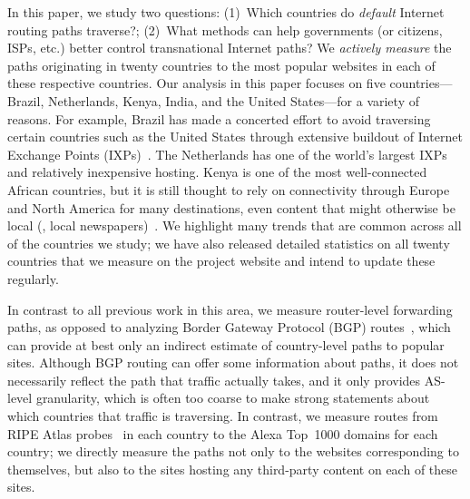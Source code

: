 In this paper, we study two questions: (1)~Which countries do {\em   default}
Internet routing paths traverse?; (2)~What methods can  help governments (or citizens, 
ISPs, etc.) better control transnational Internet paths?  We {\em actively
measure} the paths originating in twenty countries to the most popular
websites in each of these respective countries.
Our analysis in this paper focuses on five countries---Brazil, Netherlands,
Kenya, India, and the United States---for a variety of reasons.  For example,
Brazil has made a concerted effort to avoid traversing certain countries such
as the United States through extensive buildout of Internet Exchange Points
(IXPs)~\cite{brito2016dissecting}. The Netherlands has one of the world's largest IXPs and relatively
inexpensive hosting. Kenya is one of the most well-connected African
countries, but it is still thought to rely on connectivity through Europe and
North America for many destinations, even content that might otherwise be
local (\eg, local newspapers)~\cite{gupta2014peering,fanou2015diversity,chavula2014quantifying,fanou2016pushing}. We highlight many trends that are common across all
of the countries we study; we have also released detailed statistics on all twenty
countries that we measure on the project website and intend to update these regularly.

In contrast to all previous work in this area, we measure router-level
forwarding paths, as opposed to analyzing Border Gateway Protocol (BGP)
routes~\cite{karlin2009nation,shah2015characterizing}, which can provide at
best only an indirect estimate of country-level paths to popular sites.
Although BGP routing can offer some information about paths, it does not
necessarily reflect the path that traffic actually takes, and it only provides
AS-level granularity, which is often too coarse to make strong statements
about which countries that traffic is traversing.  In contrast, we measure
routes from RIPE Atlas probes~\cite{ripe_atlas} in each country to the Alexa
Top~1000 domains for each country; we directly measure the paths not only to
the websites corresponding to themselves, but also to the sites hosting any
third-party content on each of these sites.

